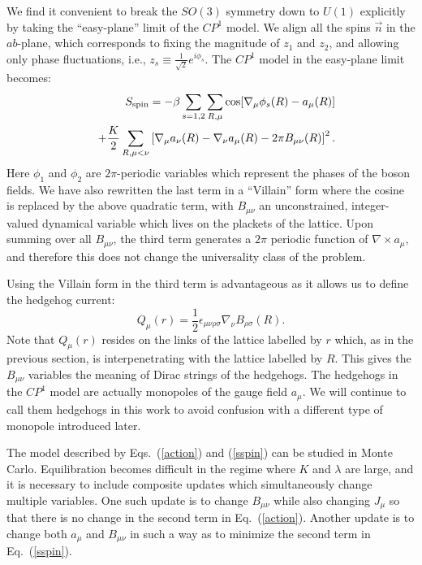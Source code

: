 \documentclass[prb,twocolumn]{revtex4-1}
\newcommand{\cp}{$CP^1$ }
\begin{document}
We find it convenient to break the $SO(3)$ symmetry down to $U(1)$ explicitly by taking the ``easy-plane'' limit of the $CP^1$ model. We align all the spins $\vec{n}$ in the $ab$-plane, which corresponds to fixing the magnitude of $z_1$ and $z_2$, and allowing only phase fluctuations, i.e., $z_s\equiv \frac{1}{\sqrt{2}}e^{i\phi_s}$. The $CP^1$ model in the easy-plane limit becomes:
\begin{eqnarray}
&&S_{\rm spin}=-\beta\sum_{s=1,2}\sum_{R,\mu} \cos[\nabla_\mu\phi_s(R)-a_\mu(R)]\nonumber\\
&&+\frac{K}{2}\sum_{R,\mu<\nu}\left[\nabla_\mu a_\nu(R)-\nabla_\nu a_\mu(R)-2\pi B_{\mu\nu}(R)\right]^2.
\label{sspin}
\end{eqnarray}
Here $\phi_1$ and $\phi_2$ are $2\pi$-periodic variables which represent the phases of the boson fields. We have also rewritten the last term in a ``Villain'' form where the cosine is replaced by the above quadratic term, with $B_{\mu\nu}$ an unconstrained, integer-valued dynamical variable which lives on the plackets of the lattice. Upon summing over all $B_{\mu\nu}$, the third term generates a $2\pi$ periodic function of $\nabla\times a_{\mu}$, and therefore this does not change the universality class of the problem.

Using the Villain form in the third term is advantageous as it allows us to define the hedgehog current:
\begin{equation}
Q_\mu(r)=\frac{1}{2}\epsilon_{\mu\nu\rho\sigma}\nabla_\nu B_{\rho\sigma}(R).
\label{mondef}
\end{equation}
Note that $Q_\mu(r)$ resides on the links of the lattice labelled by $r$ which, as in the previous section, is interpenetrating with the lattice labelled by $R$. This gives the $B_{\mu\nu}$ variables the meaning of Dirac strings of the hedgehogs. The hedgehogs in the \cp model are actually monopoles of the gauge field $a_\mu$. We will continue to call them hedgehogs in this work to avoid confusion with a different type of monopole introduced later.

The model described by  Eqs.~(\ref{action}) and (\ref{sspin}) can be studied in Monte Carlo. Equilibration becomes difficult in the regime where $K$ and $\lambda$ are large, and it is necessary to include composite updates which simultaneously change multiple variables. One such update is to change $B_{\mu\nu}$ while also changing $J_\mu$ so that there is no change in the second term in Eq.~(\ref{action}). Another update is to change both $a_\mu$ and $B_{\mu\nu}$ in such a way as to minimize the second term in Eq.~(\ref{sspin}). 
\end{document}
